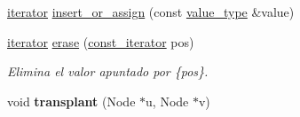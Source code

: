 \begin{DoxyCompactItemize}
\item 
\hyperlink{classaed2_1_1map_1_1iterator}{iterator} \hyperlink{classaed2_1_1map_a9128a806713bcc999ebd8a97ab77e765}{insert\+\_\+or\+\_\+assign} (const \hyperlink{classaed2_1_1map_a719db98e0ff9a837610f76be33264680}{value\+\_\+type} \&value)
\item 
\hyperlink{classaed2_1_1map_1_1iterator}{iterator} \hyperlink{classaed2_1_1map_ad8e796bf9c9c558e5ce6b61e116253fe}{erase} (\hyperlink{classaed2_1_1map_1_1const__iterator}{const\+\_\+iterator} pos)
\begin{DoxyCompactList}\small\item\em Elimina el valor apuntado por \{pos\}. \end{DoxyCompactList}\item 
\mbox{\label{classaed2_1_1map_a98b9f200c64ce02dfb67902ee00e375a}} 
void {\bfseries transplant} (Node $\ast$u, Node $\ast$v)
\end{DoxyCompactItemize}
